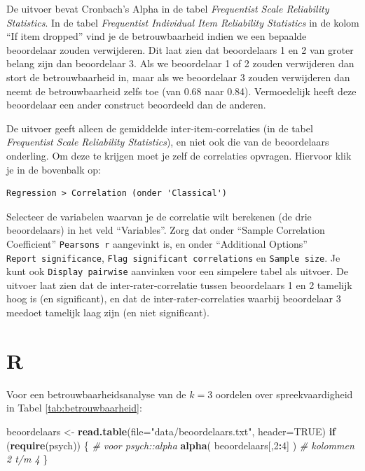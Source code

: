 \documentclass[
]{book}
\newenvironment{Shaded}{\begin{snugshade}}{\end{snugshade}}
\newcommand{\CommentTok}[1]{\textcolor[rgb]{0.56,0.35,0.01}{\textit{#1}}}
\newcommand{\ControlFlowTok}[1]{\textcolor[rgb]{0.13,0.29,0.53}{\textbf{#1}}}
\newcommand{\DataTypeTok}[1]{\textcolor[rgb]{0.13,0.29,0.53}{#1}}
\newcommand{\DecValTok}[1]{\textcolor[rgb]{0.00,0.00,0.81}{#1}}
\newcommand{\KeywordTok}[1]{\textcolor[rgb]{0.13,0.29,0.53}{\textbf{#1}}}
\newcommand{\NormalTok}[1]{#1}
\newcommand{\OperatorTok}[1]{\textcolor[rgb]{0.81,0.36,0.00}{\textbf{#1}}}
\newcommand{\OtherTok}[1]{\textcolor[rgb]{0.56,0.35,0.01}{#1}}
\newcommand{\StringTok}[1]{\textcolor[rgb]{0.31,0.60,0.02}{#1}}
\begin{document}
De uitvoer bevat Cronbach's Alpha in de tabel \emph{Frequentist Scale Reliability Statistics}. In de tabel \emph{Frequentist Individual Item Reliability Statistics} in de kolom ``If item dropped'' vind je de betrouwbaarheid indien we een bepaalde beoordelaar zouden verwijderen. Dit laat zien dat beoordelaars 1 en 2 van groter belang zijn dan beoordelaar 3. Als we beoordelaar 1 of 2 zouden verwijderen dan stort de betrouwbaarheid in, maar als we beoordelaar 3 zouden verwijderen dan neemt de betrouwbaarheid zelfs toe (van 0.68 naar 0.84). Vermoedelijk heeft deze beoordelaar een ander construct beoordeeld dan de anderen.

De uitvoer geeft alleen de gemiddelde inter-item-correlaties (in de tabel \emph{Frequentist Scale Reliability Statistics}), en niet ook die van de beoordelaars onderling. Om deze te krijgen moet je zelf de correlaties opvragen. Hiervoor klik je in de bovenbalk op:

\begin{verbatim}
Regression > Correlation (onder 'Classical')
\end{verbatim}

Selecteer de variabelen waarvan je de correlatie wilt berekenen (de drie beoordelaars) in het veld ``Variables''. Zorg dat onder ``Sample Correlation Coefficient'' \texttt{Pearson\textquotesingle{}s\ r} aangevinkt is, en onder ``Additional Options'' \texttt{Report\ significance}, \texttt{Flag\ significant\ correlations} en \texttt{Sample\ size}. Je kunt ook \texttt{Display\ pairwise} aanvinken voor een simpelere tabel als uitvoer. De uitvoer laat zien dat de inter-rater-correlatie tussen beoordelaars 1 en 2 tamelijk hoog is (en significant), en dat de inter-rater-correlaties waarbij beoordelaar 3 meedoet tamelijk laag zijn (en niet significant).

\hypertarget{r-11}{%
\section{R}\label{r-11}}

Voor een betrouwbaarheidsanalyse van de \(k=3\) oordelen over
spreekvaardigheid in Tabel \ref{tab:betrouwbaarheid}:\\

\begin{Shaded}
\begin{Highlighting}[]
\NormalTok{beoordelaars \textless{}{-}}\StringTok{ }\KeywordTok{read.table}\NormalTok{(}\DataTypeTok{file=}\StringTok{"data/beoordelaars.txt"}\NormalTok{, }\DataTypeTok{header=}\OtherTok{TRUE}\NormalTok{)}
\ControlFlowTok{if}\NormalTok{ (}\KeywordTok{require}\NormalTok{(psych)) \{ }\CommentTok{\# voor psych::alpha}
  \KeywordTok{alpha}\NormalTok{( beoordelaars[,}\DecValTok{2}\OperatorTok{:}\DecValTok{4}\NormalTok{] ) }\CommentTok{\# kolommen 2 t/m 4}
\NormalTok{\}}
\end{Highlighting}
\end{Shaded}
\end{document}
